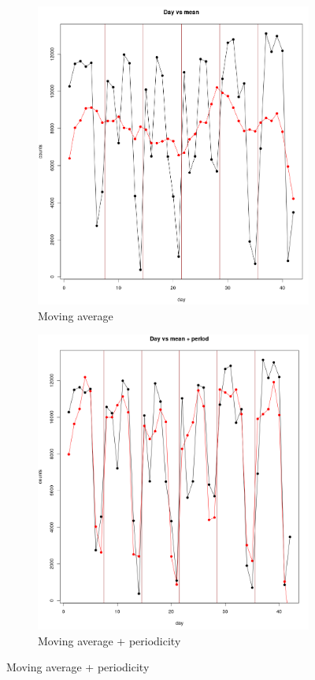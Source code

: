 \documentclass[11pt,twoside]{report}
\begin{document}
\begin{figure}[H]
	\begin{subfigure}[H]{0.5\linewidth}
		\centering
		\includegraphics[width=65 mm]{pictures/moving_average.png}
		\caption{Moving average}
		\label{fig:ma}
	\end{subfigure}
	\hfill
	\begin{subfigure}[H]{0.5\linewidth}
		\centering
		\includegraphics[width=65 mm]{pictures/period.png}
		\caption{Moving average + periodicity}
		\label{fig:period}
	\end{subfigure}
\end{figure}
\end{document}
